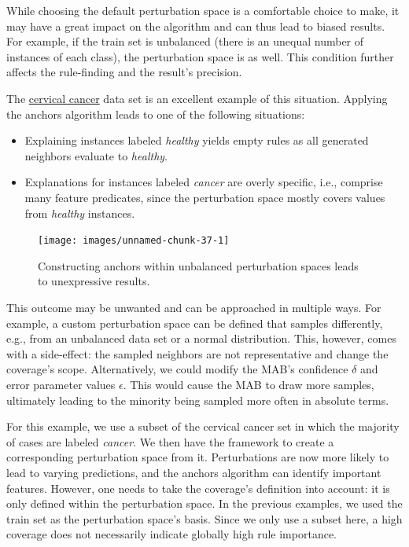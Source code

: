 \documentclass[
  12pt,
]{krantz}
\providecommand{\tightlist}{%
  \setlength{\itemsep}{0pt}\setlength{\parskip}{0pt}}
\begin{document}
While choosing the default perturbation space is a comfortable choice to make, it may have a great impact on the algorithm and can thus lead to biased results. For example, if the train set is unbalanced (there is an unequal number of instances of each class), the perturbation space is as well. This condition further affects the rule-finding and the result's precision.

The \protect\hyperlink{cervical}{cervical cancer} data set is an excellent example of this situation.
Applying the anchors algorithm leads to one of the following situations:

\begin{itemize}
\tightlist
\item
  Explaining instances labeled \emph{healthy} yields empty rules as all generated neighbors evaluate to \emph{healthy}.
\item
  Explanations for instances labeled \emph{cancer} are overly specific, i.e., comprise many feature predicates, since the perturbation space mostly covers values from \emph{healthy} instances.
\end{itemize}

\begin{figure}

{\centering \texttt{[image: images/unnamed-chunk-37-1]} 

}

\caption{Constructing anchors within unbalanced perturbation spaces leads to unexpressive results.}\label{fig:unnamed-chunk-37}
\end{figure}

This outcome may be unwanted and can be approached in multiple ways. For example, a custom perturbation space can be defined that samples differently, e.g., from an unbalanced data set or a normal distribution. This, however, comes with a side-effect: the sampled neighbors are not representative and change the coverage's scope. Alternatively, we could modify the MAB's confidence \(\delta\) and error parameter values \(\epsilon\). This would cause the MAB to draw more samples, ultimately leading to the minority being sampled more often in absolute terms.

For this example, we use a subset of the cervical cancer set in which the majority of cases are labeled \emph{cancer}. We then have the framework to create a corresponding perturbation space from it. Perturbations are now more likely to lead to varying predictions, and the anchors algorithm can identify important features. However, one needs to take the coverage's definition into account: it is only defined within the perturbation space. In the previous examples, we used the train set as the perturbation space's basis. Since we only use a subset here, a high coverage does not necessarily indicate globally high rule importance.
\end{document}
